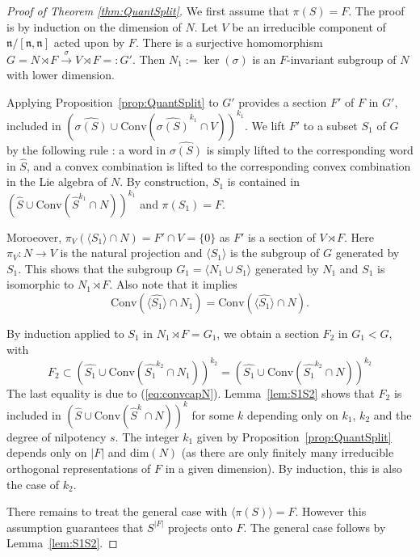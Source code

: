\documentclass[11pt,leqno]{article}
\theoremstyle{plain}
\theoremstyle{definition}
\theoremstyle{remark}
\numberwithin{equation}{section}
\begin{document}
\begin{proof}[Proof of Theorem \ref{thm:QuantSplit}] We first assume that $\pi(S)=F$.
The proof is by induction on the dimension of $N$. Let $V$ be an irreducible component of $\mathfrak{n}/[\mathfrak{n},\mathfrak{n}]$ acted upon by $F$. There is a surjective homomorphism $G=N\rtimes F \overset{\sigma}{\longrightarrow} V \rtimes F =:G'$. Then $N_1:=\ker(\sigma)$ is an $F$-invariant subgroup of $N$ with lower dimension.

Applying Proposition~\ref{prop:QuantSplit} to $G'$ provides a section $F'$ of $F$ in $G'$, included in $(\widehat{\sigma(S)}\cup\mathrm{Conv}(\widehat{\sigma(S)}^{k_1}\cap V))^{k_1}$. We lift $F'$ to a subset $S_1$ of $G$ by the following rule : a word in $\widehat{\sigma(S)}$ is simply lifted to the corresponding word in $\widehat{S}$, and a convex combination is lifted to the corresponding convex combination in the Lie algebra of $N$. 
By construction, $S_1$ is contained in $(\widehat{S}\cup\mathrm{Conv}(\widehat{S}^{k_1}\cap N))^{k_1}$ and $\pi(S_1)=F$.

Moroeover, $\pi_V(\langle S_1\rangle\cap N)=F'\cap V=\{0\}$ as $F'$ is a section of $V\rtimes F$. Here $\pi_V:N\to V$ is the natural projection and $\langle S_1\rangle$ is the subgroup of $G$ generated by $S_1$. This shows that the subgroup $G_1=\langle N_1 \cup S_1\rangle$ generated by $N_1$ and $S_1$ is isomorphic to $N_1 \rtimes F$.
Also note that it implies 
\begin{equation}\label{eq:convcapN}
\mathrm{Conv}(\langle\widehat{S_1}\rangle\cap N_1)=\mathrm{Conv}(\langle\widehat{S_1}\rangle\cap N).
\end{equation}

By induction applied to $S_1$ in $N_1\rtimes F=G_1$, we obtain a section $F_2$ in $G_1<G$, with
 \[
 F_2 \subset (\widehat{S_1}\cup\mathrm{Conv}(\widehat{S_1}^{k_2}\cap N_1))^{k_2}=(\widehat{S_1}\cup\mathrm{Conv}(\widehat{S_1}^{k_2}\cap N))^{k_2}
 \]
 The last equality is due to (\ref{eq:convcapN}). Lemma~\ref{lem:S1S2} shows that $F_2$ is included in $(\widehat{S}\cup\mathrm{Conv}(\widehat{S}^{k}\cap N))^k$ for some $k$ depending only on $k_1$, $k_2$ and the degree of nilpotency $s$. The integer $k_1$ given by Proposition~\ref{prop:QuantSplit} depends only on $|F|$ and $\mathrm{dim}(N)$ (as there are only finitely many irreducible orthogonal representations of $F$ in a given dimension). By induction, this is also the case of $k_2$.
 
 There remains to treat the general case with $\langle\pi(S)\rangle=F$. However this assumption guarantees that $S^{|F|}$ projects onto $F$. The general case follows by Lemma~\ref{lem:S1S2}.
 \end{proof}
\end{document}
